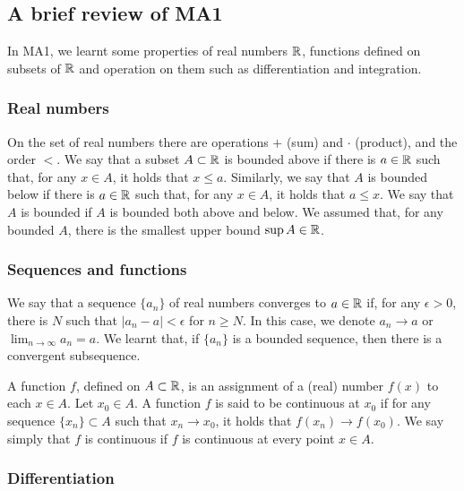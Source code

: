 \subsection*{A brief review of MA1}
In MA1, we learnt some properties of real numbers $\mathbb{R}$, functions defined on subsets of $\mathbb{R}$
and operation on them such as differentiation and integration.

\subsubsection*{Real numbers}
On the set of real numbers there are operations $+$ (sum) and $\cdot$ (product), and the order $<$.
We say that a subset $A \subset \mathbb{R}$ is bounded above if there is $a \in \mathbb{R}$ such that,
for any $x \in A$, it holds that $x \le a$. Similarly, we say that $A$ is bounded below if there is $a \in \mathbb{R}$
such that, for any $x \in A$, it holds that $a \le x$. We say that $A$ is bounded if $A$ is bounded both above and below.
We assumed that, for any bounded $A$, there is the smallest upper bound $\sup A \in \mathbb{R}$.

\subsubsection*{Sequences and functions}

We say that a sequence $\{a_n\}$ of real numbers converges to $a \in \mathbb{R}$ if, for any $\epsilon > 0$,
there is $N$ such that $|a_n - a| < \epsilon$ for $n \ge N$. In this case, we denote $a_n \to a$ or $\lim_{n\to \infty}a_n = a$.
We learnt that, if $\{a_n\}$ is a bounded sequence, then there is a convergent subsequence.

A function $f$, defined on $A \subset \mathbb{R}$, is an assignment of a (real) number $f(x)$ to each $x \in A$.
Let $x_0 \in A$. A function $f$ is said to be continuous at $x_0$ if for any sequence $\{x_n\} \subset A$ such that $x_n \to x_0$,
it holds that $f(x_n) \to f(x_0)$. We say simply that $f$ is continuous if $f$ is continuous at every point $x \in A$.

\subsubsection*{Differentiation}

